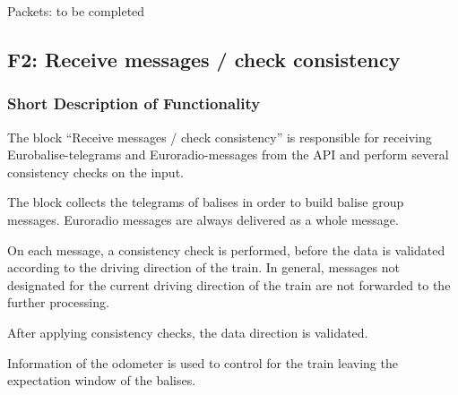 \documentclass{template/openetcs_report}
\begin{document}
Packets:
to be completed

\subsection{F2: Receive messages / check consistency}
\subsubsection{Short Description of Functionality}

The block ``Receive messages / check consistency'' is responsible for receiving Eurobalise-telegrams and Euroradio-messages from the API and perform several consistency checks on the input.

The block collects the telegrams of balises in order to build balise group messages. Euroradio messages are always delivered as a whole message. 

On each message, a consistency check is performed, before the data is validated according to the driving direction of the train. In general, messages not designated for the current driving direction of the train are not forwarded to the further processing.

After applying consistency checks, the data direction is validated.

Information of the odometer is used to control for the train leaving the expectation window of the balises. %

\end{document}
